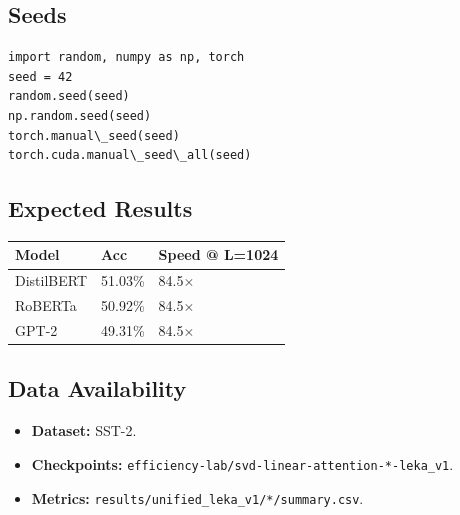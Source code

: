 \subsection{Seeds}

\begin{lstlisting}
import random, numpy as np, torch
seed = 42
random.seed(seed)
np.random.seed(seed)
torch.manual\_seed(seed)
torch.cuda.manual\_seed\_all(seed)
\end{lstlisting}

\subsection{Expected Results}

\begin{table}[H]
\centering
\small
\begin{tabular}{lll}
\toprule
\textbf{Model} & \textbf{Acc} & \textbf{Speed @ L=1024} \\
\midrule
DistilBERT & 51.03\% & 84.5$\times$ \\
RoBERTa & 50.92\% & 84.5$\times$ \\
GPT-2 & 49.31\% & 84.5$\times$ \\
\bottomrule
\end{tabular}
\end{table}

\subsection{Data Availability}

\begin{itemize}
\item \textbf{Dataset:} SST-2.
\item \textbf{Checkpoints:} \texttt{efficiency-lab/svd-linear-attention-*-leka\_v1}.
\item \textbf{Metrics:} \texttt{results/unified\_leka\_v1/*/summary.csv}.

\end{itemize}
